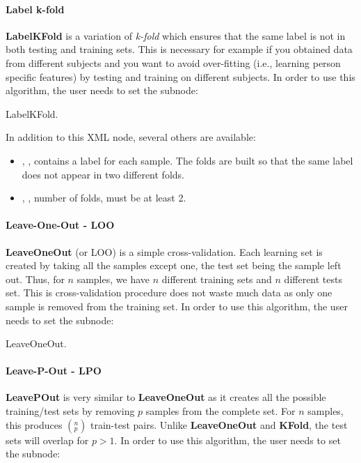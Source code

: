 \paragraph{Label k-fold}
\textbf{LabelKFold} is a variation of \textit{k-fold} which ensures that the same label is not in both testing and
training sets. This is necessary for example if you obtained data from different subjects and you want to avoid
over-fitting (i.e., learning person specific features) by testing and training on different subjects.
In order to use this algorithm, the user needs to set the subnode:

LabelKFold.

In addition to this XML node, several others are available:
\begin{itemize}
  \item {}, , contains a label for
    each sample. The folds are built so that the same label does not appear in two different folds.
  \item {}, , number of folds, must be at least 2. 
\end{itemize}

\paragraph{Leave-One-Out - LOO}
\textbf{LeaveOneOut} (or LOO) is a simple cross-validation. Each learning set is created by taking all the samples
except one, the test set being the sample left out. Thus, for $n$ samples, we have $n$ different training sets and
$n$ different tests set. This is cross-validation procedure does not waste much data as only one sample is removed from
the training set.
In order to use this algorithm, the user needs to set the subnode:

LeaveOneOut.

\paragraph{Leave-P-Out - LPO}
\textbf{LeavePOut} is very similar to \textbf{LeaveOneOut} as it creates all the possible training/test sets by removing
$p$ samples from the complete set. For $n$ samples, this produces $(^n_p)$ train-test pairs. Unlike \textbf{LeaveOneOut}
and \textbf{KFold}, the test sets will overlap for $p > 1$.
In order to use this algorithm, the user needs to set the subnode:

